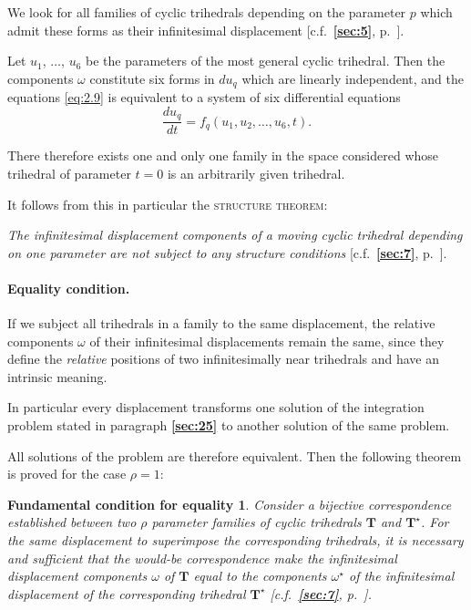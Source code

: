 \documentclass[leqno,11pt]{book}
\numberwithin{equation}{chapter}
\theoremstyle{shape1}
\theoremstyle{shapesmall}
\newcommand{\fsref}[1]{{\rm\textsection\textbf{\ref{sec:#1}}}}
\newcommand{\str}{^{\star}}
\newcommand{\somespace}{\vspace{9pt}}
\begin{document}
We look for all families of cyclic trihedrals depending on the parameter $p$ which admit these forms as their infinitesimal displacement [c.f.~\fsref{5}, p.~\pageref{sec:5}].

Let $u_{1}$, $\dots$, $u_{6}$ be the parameters of the most general cyclic trihedral. Then the components $\omega$ constitute six forms in $du_{q}$ which are linearly independent, and the equations \eqref{eq:2.9} is equivalent to a system of six differential equations
\[
\frac{du_{q}}{dt}=f_{q}(u_{1},u_{2},\dots,u_{6},t).
\]

There therefore exists one and only one family in the space considered whose trihedral of parameter $t=0$ is an arbitrarily given trihedral.

It follows from this in particular the \textsc{structure theorem}:

\somespace

\emph{The infinitesimal displacement components of a moving cyclic trihedral depending on one parameter are not subject to any structure conditions} [c.f.~\fsref{7}, p.~\pageref{sec:7}].

\paragraph{Equality condition.}
\label{sec:26}
If we subject all trihedrals in a family to the same displacement, the relative components $\omega$ of their infinitesimal displacements remain the same, since they define the \emph{relative} positions of two infinitesimally near trihedrals and have an intrinsic meaning.

In particular every displacement transforms one solution of the integration problem stated in paragraph \fsref{25} to another solution of the same problem.

All solutions of the problem are therefore equivalent. Then the following theorem is proved for the case $\rho=1$:

\newtheorem*{cfd26}{Fundamental condition for equality}
\begin{cfd26}
  Consider a bijective correspondence established between two $\rho$ parameter families of cyclic trihedrals $\mathbf{T}$ and $\mathbf{T}\str$. For the same displacement to superimpose the corresponding trihedrals, it is necessary and sufficient that the would-be correspondence make the infinitesimal displacement components $\omega$ of $\mathbf{T}$ equal to the components $\omega\str$ of the infinitesimal displacement of the corresponding trihedral $\mathbf{T}\str$ \emph{[c.f.~\fsref{7}, p.~\pageref{sec:7}].}
\end{cfd26}
\end{document}
